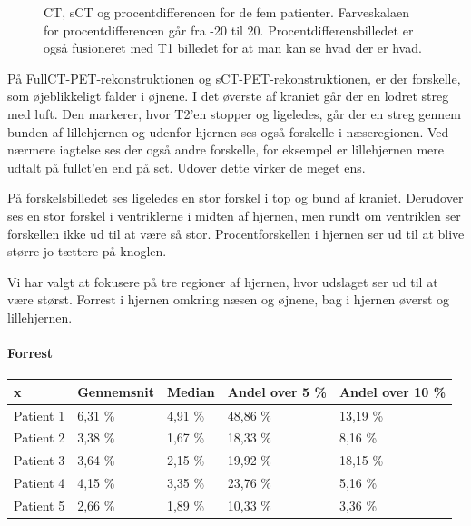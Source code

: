 \begin{figure}
\begin{subfigure}[b]{0.3\textwidth}
        \label{col:loocv_pet_pat5_pd}
    \end{subfigure}
    \caption{CT, sCT og procentdifferencen for de fem patienter. Farveskalaen for procentdifferencen går fra -20 til 20. Procentdifferensbilledet er også fusioneret med T1 billedet for at man kan se hvad der er hvad.}
    \label{col:loocv_pet}
\end{figure}

På FullCT-PET-rekonstruktionen og sCT-PET-rekonstruktionen, er der
forskelle, som øjeblikkeligt falder i øjnene. I det øverste af kraniet
går der en lodret streg med luft. Den markerer, hvor T2'en stopper
og ligeledes, går der en streg gennem bunden af lillehjernen og udenfor
hjernen ses også forskelle i næseregionen. Ved nærmere iagtelse ses
der også andre forskelle, for eksempel er lillehjernen mere udtalt på
fullct'en end på sct. Udover dette virker de meget ens.

På forskelsbilledet ses ligeledes en stor forskel i top og bund af
kraniet. Derudover ses en stor forskel i ventriklerne i midten af
hjernen, men rundt om ventriklen ser forskellen ikke ud til at være så
stor. Procentforskellen i hjernen ser ud til at blive større jo tættere
på knoglen.

Vi har valgt at fokusere på tre regioner af hjernen, hvor udslaget ser ud
til at være størst. Forrest i hjernen omkring næsen og øjnene, bag
i hjernen øverst og lillehjernen.


\paragraph{Forrest}

\begin{center}
    \begin{tabular}{| l | l | l | l | l |}
    \hline
    x & Gennemsnit & Median & Andel over 5 \% & Andel over 10 \% \\ \hline
    Patient 1 & 6,31 \% & 4,91 \% & 48,86 \% & 13,19 \% \\ \hline
    Patient 2 & 3,38 \% & 1,67 \% & 18,33 \% & 8,16 \% \\ \hline
    Patient 3 & 3,64 \% & 2,15 \% & 19,92 \% & 18,15 \% \\ \hline
    Patient 4 & 4,15 \% & 3,35 \% & 23,76 \% & 5,16 \% \\ \hline
    Patient 5 & 2,66 \% & 1,89 \% & 10,33 \% & 3,36 \% \\ \hline
    \end{tabular}
\end{center}

